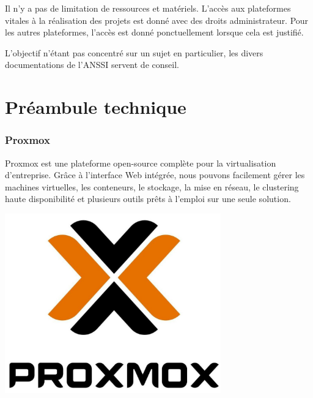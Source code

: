 \documentclass[12pt, a4paper, twoside]{article}
\begin{document}
Il n'y a pas de limitation de ressources et matériels.
L'accès aux plateformes vitales à la réalisation des projets est donné avec des droits administrateur.
Pour les autres plateformes, l'accès est donné ponctuellement lorsque cela est justifié.

L'objectif n'étant pas concentré sur un sujet en particulier, les divers documentations de l'\gls{ANSSI} servent de conseil.

\newpage
\part{Préambule technique}
\label{part: preambule_technique}
\section{Proxmox}
\noindent%
\begin{minipage}{.7\textwidth}%
\gls{Proxmox} est une plateforme open-source complète pour la virtualisation d'entreprise. 
Grâce à l'interface Web intégrée, nous pouvons facilement gérer les machines virtuelles, les conteneurs, le stockage, la mise en réseau, le clustering haute disponibilité et plusieurs outils prêts à l'emploi sur une seule solution. \\

\end{minipage}%
\hfill
\begin{minipage}{.3\textwidth}%
\begin{center}
\includegraphics[width=0.7\textwidth]{src/logo_proxmox.JPG}
\end{center}
\end{minipage}%
\end{document}
